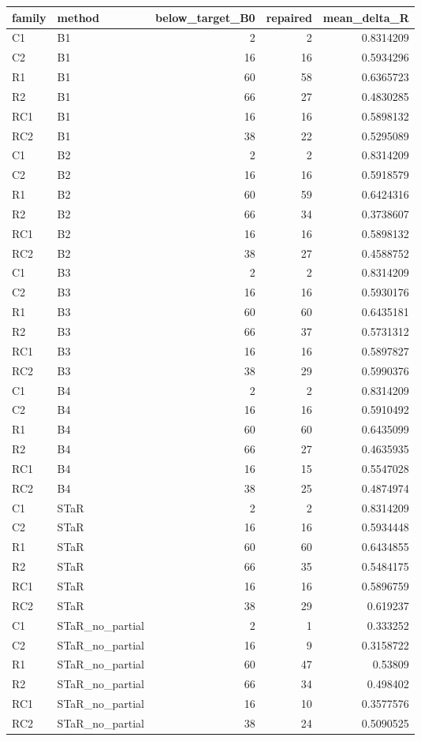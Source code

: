 \begin{longtable}{llrrr}
\hline
family & method & below\_target\_B0 & repaired & mean\_delta\_R \\
\hline
C1 & B1 & 2 & 2 & 0.8314209 \\
C2 & B1 & 16 & 16 & 0.5934296 \\
R1 & B1 & 60 & 58 & 0.6365723 \\
R2 & B1 & 66 & 27 & 0.4830285 \\
RC1 & B1 & 16 & 16 & 0.5898132 \\
RC2 & B1 & 38 & 22 & 0.5295089 \\
C1 & B2 & 2 & 2 & 0.8314209 \\
C2 & B2 & 16 & 16 & 0.5918579 \\
R1 & B2 & 60 & 59 & 0.6424316 \\
R2 & B2 & 66 & 34 & 0.3738607 \\
RC1 & B2 & 16 & 16 & 0.5898132 \\
RC2 & B2 & 38 & 27 & 0.4588752 \\
C1 & B3 & 2 & 2 & 0.8314209 \\
C2 & B3 & 16 & 16 & 0.5930176 \\
R1 & B3 & 60 & 60 & 0.6435181 \\
R2 & B3 & 66 & 37 & 0.5731312 \\
RC1 & B3 & 16 & 16 & 0.5897827 \\
RC2 & B3 & 38 & 29 & 0.5990376 \\
C1 & B4 & 2 & 2 & 0.8314209 \\
C2 & B4 & 16 & 16 & 0.5910492 \\
R1 & B4 & 60 & 60 & 0.6435099 \\
R2 & B4 & 66 & 27 & 0.4635935 \\
RC1 & B4 & 16 & 15 & 0.5547028 \\
RC2 & B4 & 38 & 25 & 0.4874974 \\
C1 & STaR & 2 & 2 & 0.8314209 \\
C2 & STaR & 16 & 16 & 0.5934448 \\
R1 & STaR & 60 & 60 & 0.6434855 \\
R2 & STaR & 66 & 35 & 0.5484175 \\
RC1 & STaR & 16 & 16 & 0.5896759 \\
RC2 & STaR & 38 & 29 & 0.619237 \\
C1 & STaR\_no\_partial & 2 & 1 & 0.333252 \\
C2 & STaR\_no\_partial & 16 & 9 & 0.3158722 \\
R1 & STaR\_no\_partial & 60 & 47 & 0.53809 \\
R2 & STaR\_no\_partial & 66 & 34 & 0.498402 \\
RC1 & STaR\_no\_partial & 16 & 10 & 0.3577576 \\
RC2 & STaR\_no\_partial & 38 & 24 & 0.5090525 \\
\hline
\end{longtable}
